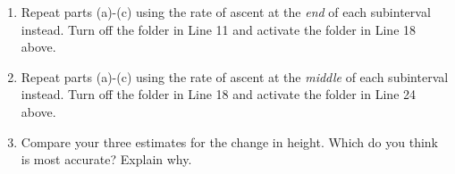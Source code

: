 \documentclass{ximera}
\begin{document}
\begin{example}
\begin{enumerate}
\item Repeat parts (a)-(c) using the rate of ascent at the \emph{end} of each subinterval instead. Turn off the folder in Line 11 and activate the folder in Line 18 above.

\item Repeat parts (a)-(c) using the rate of ascent at the \emph{middle} of each subinterval instead. Turn off the folder in Line 18 and activate the folder in Line 24 above.

\item Compare your three estimates for the change in height. Which do you think is most accurate? Explain why.

\end{enumerate}





\end{example} 
\end{document}
